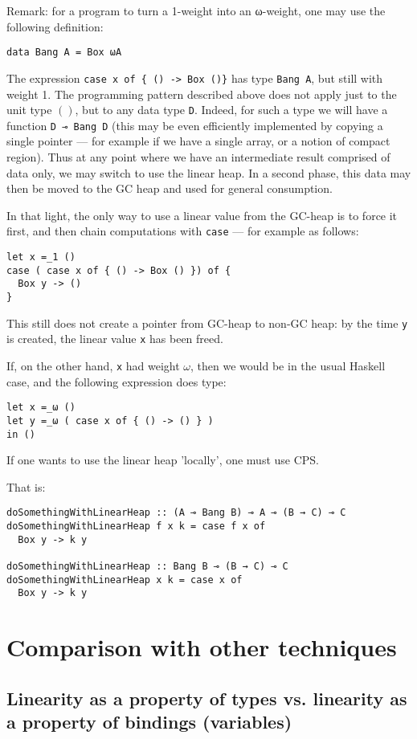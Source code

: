 \documentclass[11pt]{article}
\begin{document}
Remark: for a program to turn a 1-weight into an ω-weight, one may use
the following definition:
\begin{verbatim}
data Bang A = Box ωA
\end{verbatim}
The expression \verb|case x of { () -> Box ()}| has type
\verb|Bang A|, but still with weight 1.  The programming pattern described above does not apply
just to the unit type $()$, but to any data type \verb|D|. Indeed, for such
a type we will have a function \verb|D ⊸ Bang D| (this may be even
efficiently implemented by copying a single pointer --- for example if
we have a single array, or a notion of compact region).  Thus at any
point where we have an intermediate result comprised of data only, we
may switch to use the linear heap. In a second phase, this data may
then be moved to the GC heap and used for general consumption.

In that light, the only way to use a linear value from the GC-heap is
to force it first, and then chain computations with \verb|case| --- for
example as follows:
\begin{verbatim}
let x =_1 ()
case ( case x of { () -> Box () }) of {
  Box y -> ()
}
\end{verbatim}
This still does not create a pointer from GC-heap to non-GC heap: by the
time \verb|y| is created, the linear value \verb|x| has been freed.

If, on the other hand, \verb|x| had weight $ω$, then we would be in the
usual Haskell case, and the following expression does type:
\begin{verbatim}
let x =_ω ()
let y =_ω ( case x of { () -> () } )
in ()
\end{verbatim}

If one wants to use the linear heap 'locally', one must use CPS.

That is:

\begin{verbatim}
doSomethingWithLinearHeap :: (A ⊸ Bang B) ⊸ A ⊸ (B → C) ⊸ C
doSomethingWithLinearHeap f x k = case f x of
  Box y -> k y

doSomethingWithLinearHeap :: Bang B ⊸ (B → C) ⊸ C
doSomethingWithLinearHeap x k = case x of
  Box y -> k y
\end{verbatim}

\section{Comparison with other techniques}

\subsection{Linearity as a property of types vs. linearity as a property of bindings (variables)}
\end{document}
